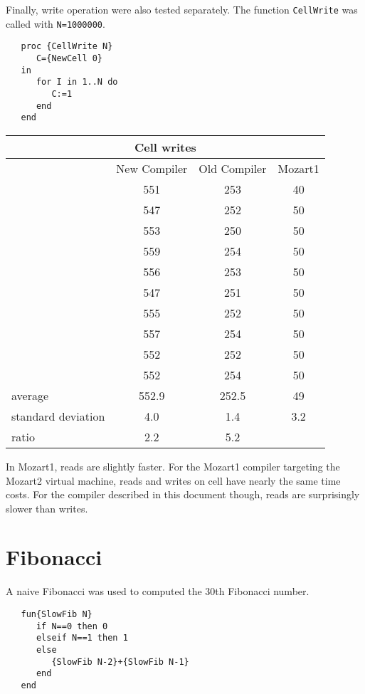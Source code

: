 \documentclass[a4paper]{memoir}
\begin{document}
\begin{appendices}
Finally, write operation were also tested separately. The function
\lstinline!CellWrite! was called with \lstinline!N=1000000!.

\begin{lstlisting}
   proc {CellWrite N}
      C={NewCell 0}
   in
      for I in 1..N do
         C:=1
      end
   end
\end{lstlisting}

\begin{center}
\begin{tabular} {| l c c c|}
\hline
\multicolumn{4}{|c|}{\textbf{Cell writes}} \\ \hline
  & New Compiler& Old Compiler & Mozart1 \\
  &         551& 253& 40\\ 
  &         547& 252& 50\\
  &         553& 250& 50\\
  &         559& 254& 50\\
  &         556& 253& 50\\
  &         547& 251& 50\\
  &         555& 252& 50\\
  &         557& 254& 50\\
  &         552& 252& 50\\
  &         552& 254& 50\\ \hline
average& 552.9& 252.5 & 49\\
standard deviation&4.0& 1.4& 3.2\\
ratio& 2.2& 5.2& \\
\hline
\end{tabular}
\end{center}

In Mozart1, reads are slightly faster. For the Mozart1 compiler targeting the
Mozart2 virtual machine, reads and writes on cell have nearly the same time
costs. For the compiler described in this document though, reads are surprisingly slower than
writes. 


\section{Fibonacci}

A naive Fibonacci was used to computed the 30th Fibonacci number. 

\begin{lstlisting}
   fun{SlowFib N}
      if N==0 then 0
      elseif N==1 then 1
      else
         {SlowFib N-2}+{SlowFib N-1}
      end
   end
\end{lstlisting}


\end{appendices}
\end{document}
